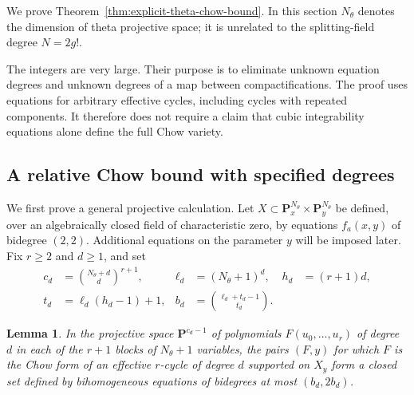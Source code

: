\documentclass[11pt]{article}
\newtheorem{lemma}[theorem]{Lemma}
\theoremstyle{definition}
\theoremstyle{remark}
\begin{document}
We prove Theorem~\ref{thm:explicit-theta-chow-bound}.  In this
section $N_\theta$ denotes the dimension of theta projective space;
it is unrelated to the splitting-field degree $N=2g!$.


The integers are very large.  Their purpose is to eliminate unknown
equation degrees and unknown degrees of a map between compactifications.
The proof uses equations for arbitrary effective cycles, including
cycles with repeated components.  It therefore does not require a
claim that cubic integrability equations alone define the full Chow
variety.

\subsection{A relative Chow bound with specified degrees}

We first prove a general projective calculation.  Let
$X\subset\mathbf P^{N_\theta}_x\times\mathbf P^{N_\theta}_y$ be defined, over an
algebraically closed field of characteristic zero, by equations
$f_a(x,y)$ of bidegree $(2,2)$.  Additional equations on the parameter
$y$ will be imposed later.  Fix $r\geq2$ and $d\geq1$, and set
\begin{align*}
 c_d&=\binom{N_\theta+d}{d}^{r+1},&
 \ell_d&=(N_\theta+1)^d,& h_d&=(r+1)d,\\
 t_d&=\ell_d(h_d-1)+1,&
 b_d&=\binom{\ell_d+t_d-1}{t_d}.
\end{align*}

\begin{lemma}\label{lem:explicit-relative-chow}
In the projective space $\mathbf P^{c_d-1}$ of polynomials
$F(u_0,\ldots,u_r)$ of degree $d$ in each of the $r+1$ blocks of
$N_\theta+1$ variables, the pairs $(F,y)$ for which $F$ is the Chow form of
an effective $r$-cycle of degree $d$ supported on $X_y$ form a closed
set defined by bihomogeneous equations of bidegrees at most
$(b_d,2b_d)$.
\end{lemma}
\end{document}
